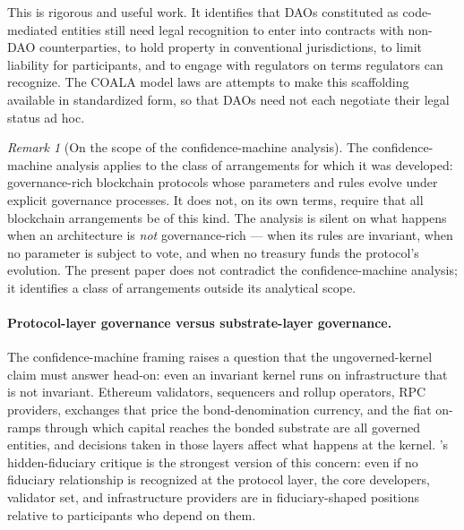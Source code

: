 \documentclass[11pt,a4paper]{article}
\theoremstyle{remark}
\newtheorem{remark}{Remark}[section]
\begin{document}
This is rigorous and useful work. It identifies that DAOs
constituted as code-mediated entities still need legal
recognition to enter into contracts with non-DAO counterparties,
to hold property in conventional jurisdictions, to limit
liability for participants, and to engage with regulators on
terms regulators can recognize. The COALA model laws are
attempts to make this scaffolding available in standardized
form, so that DAOs need not each negotiate their legal status
ad hoc.

\begin{remark}[On the scope of the confidence-machine analysis]
The confidence-machine analysis applies to the class of
arrangements for which it was developed: governance-rich
blockchain protocols whose parameters and rules evolve under
explicit governance processes. It does not, on its own terms,
require that all blockchain arrangements be of this kind. The
analysis is silent on what happens when an architecture is
\emph{not} governance-rich --- when its rules are invariant,
when no parameter is subject to vote, and when no treasury
funds the protocol's evolution. The present paper does not
contradict the confidence-machine analysis; it identifies a
class of arrangements outside its analytical scope.
\end{remark}

\paragraph{Protocol-layer governance versus substrate-layer governance.}
The confidence-machine framing raises a question that the
ungoverned-kernel claim must answer head-on: even an invariant
kernel runs on infrastructure that is not invariant. Ethereum
validators, sequencers and rollup operators, RPC providers,
exchanges that price the bond-denomination currency, and the
fiat on-ramps through which capital reaches the bonded substrate
are all governed entities, and decisions taken in those layers
affect what happens at the kernel.
\citet{walch2017path}'s hidden-fiduciary critique is the
strongest version of this concern: even if no fiduciary
relationship is recognized at the protocol layer, the
core developers, validator set, and infrastructure providers are
in fiduciary-shaped positions relative to participants who
depend on them.
\end{document}
